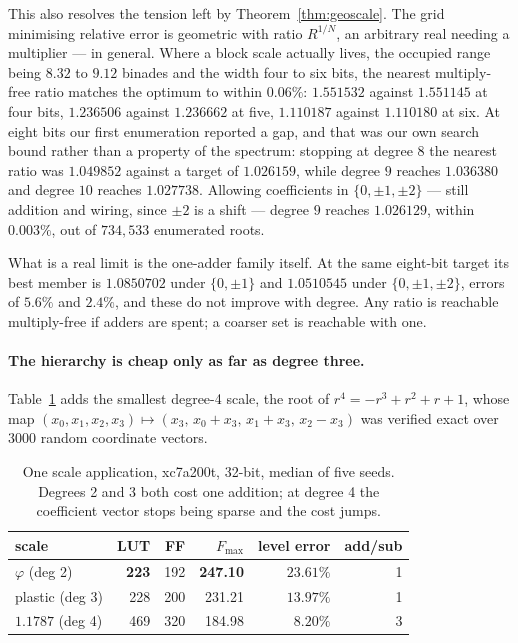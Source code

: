 \documentclass[11pt]{article}
\theoremstyle{definition}
\begin{document}
This also resolves the tension left by Theorem~\ref{thm:geoscale}. The grid
minimising relative error is geometric with ratio $R^{1/N}$, an arbitrary real
needing a multiplier --- in general. Where a block scale actually lives, the
occupied range being $8.32$ to $9.12$ binades and the width four to six bits,
the nearest multiply-free ratio matches the optimum to within $0.06\%$:
$1.551532$ against $1.551145$ at four bits, $1.236506$ against $1.236662$ at
five, $1.110187$ against $1.110180$ at six. At eight bits our first enumeration reported a gap, and that was our own search
bound rather than a property of the spectrum: stopping at degree $8$ the nearest
ratio was $1.049852$ against a target of $1.026159$, while degree $9$ reaches
$1.036380$ and degree $10$ reaches $1.027738$. Allowing coefficients in
$\{0,\pm1,\pm2\}$ --- still addition and wiring, since $\pm2$ is a shift ---
degree $9$ reaches $1.026129$, within $0.003\%$, out of $734{,}533$ enumerated
roots.

What is a real limit is the one-adder family itself. At the same eight-bit
target its best member is $1.0850702$ under $\{0,\pm1\}$ and $1.0510545$ under
$\{0,\pm1,\pm2\}$, errors of $5.6\%$ and $2.4\%$, and these do not improve with
degree. Any ratio is reachable multiply-free if adders are spent; a coarser set
is reachable with one.

\paragraph{The hierarchy is cheap only as far as degree three.}
Table~\ref{tab:deg4} adds the smallest degree-4 scale, the root of
$r^4=-r^3+r^2+r+1$, whose map $(x_0,x_1,x_2,x_3)\mapsto(x_3,\,x_0{+}x_3,\,
x_1{+}x_3,\,x_2{-}x_3)$ was verified exact over $3000$ random coordinate
vectors.

\begin{table}[t]\centering
\caption{One scale application, xc7a200t, 32-bit, median of five seeds. Degrees
2 and 3 both cost one addition; at degree 4 the coefficient vector stops being
sparse and the cost jumps.}
\label{tab:deg4}
\begin{tabular}{lrrrrr}
\toprule
scale & LUT & FF & $F_{\max}$ & level error & add/sub \\
\midrule
$\varphi$ (deg 2)      & \textbf{223} & 192 & \textbf{247.10} & $23.61\%$ & 1 \\
plastic (deg 3)        & 228 & 200 & 231.21 & $13.97\%$ & 1 \\
$1.1787$ (deg 4)       & 469 & 320 & 184.98 & $\mathbf{8.20\%}$ & 3 \\
\bottomrule
\end{tabular}
\end{table}
\end{document}
